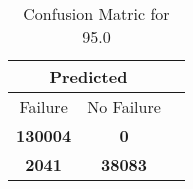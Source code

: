 \begin{table}[] 
\caption{Confusion Matric for 95.0} 
\label{Table: Prediction Accuracy-DMD95.0OnlySunEKF-resetReflectionperfectNoFailurePrediction-Reflection} 
\centering 
\begin{tabular} 
 {@{}ccc@{}} 
\toprule 
\multicolumn{2}{c}{\textbf{Predicted}}
 \\ \midrule 
\multicolumn{1}{|c|}{Failure} & 
\multicolumn{1}{c|}{No Failure}
 \\ \midrule 
\multicolumn{1}{|c|}{\color{green}\textbf{130004}} & 
\multicolumn{1}{c|}{\color{red}\textbf{0}}
 \\ \midrule 
\multicolumn{1}{|c|}{\color{red}\textbf{2041}} & 
\multicolumn{1}{c|}{\color{green}\textbf{38083}}
 \\ \bottomrule 
\end{tabular} 
\end{table} 
